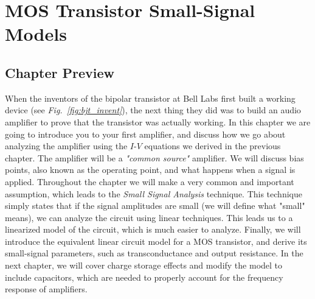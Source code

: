 \chapter{MOS Transistor Small-Signal Models}
\label{ch:ch09_mos_ss_dc}
\graphicspath{{./figs_mos_ss_dc/}}
\section{Chapter Preview}
When the inventors of the bipolar transistor at Bell Labs first built a working device (see \emph{Fig.~\ref{fig:bjt_invent}}), the next thing they did was to build an audio amplifier to prove that the transistor was actually working.  In this chapter we are going to introduce you to your first amplifier, and discuss how we go about analyzing the amplifier using the $I$-$V$ equations we derived in the previous chapter.  The amplifier will be a \emph{"common source"} amplifier.  We will discuss bias points, also known as the operating point, and what happens when a signal is applied.  Throughout the chapter we will make a very common and important assumption, which leads to the \emph{Small Signal Analysis} technique.  This technique simply states that if the signal amplitudes are small (we will define what "small" means), we can analyze the circuit using linear techniques. This leads us to a linearized model of the circuit, which is much easier to analyze.  Finally, we will introduce the equivalent linear circuit model for a MOS transistor, and derive its small-signal parameters, such as transconductance and output resistance.  In the next chapter, we will cover charge storage effects and modify the model to include capacitors, which are needed to properly account for the frequency response of amplifiers.
